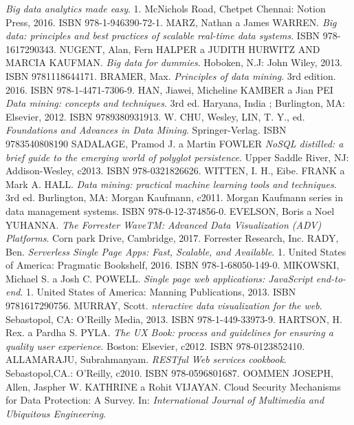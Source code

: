 \begin{thebibliography}{99}
\textit{Big data analytics made easy}.
1. McNichols Road, Chetpet Chennai: Notion Press, 2016. ISBN 978-1-946390-72-1.
MARZ, Nathan a James WARREN.
\textit{Big data: principles and best practices of scalable real-time data systems}.
ISBN 978-1617290343.
NUGENT, Alan, Fern HALPER a JUDITH HURWITZ AND MARCIA KAUFMAN.
\textit{Big data for dummies}.
Hoboken, N.J: John Wiley, 2013. ISBN 9781118644171.
BRAMER, Max.
\textit{Principles of data mining}.
3rd edition. 2016. ISBN 978-1-4471-7306-9.
HAN, Jiawei, Micheline KAMBER a Jian PEI
\textit{Data mining: concepts and techniques}.
3rd ed. Haryana, India ; Burlington, MA: Elsevier, 2012. ISBN 9789380931913.
W. CHU, Wesley, LIN, T. Y., ed.
\textit{Foundations and Advances in Data Mining}.
Springer-Verlag. ISBN 9783540808190
SADALAGE, Pramod J. a Martin FOWLER
\textit{NoSQL distilled: a brief guide to the emerging world of polyglot persistence}.
Upper Saddle River, NJ: Addison-Wesley, c2013. ISBN 978-0321826626.
WITTEN, I. H., Eibe. FRANK a Mark A. HALL.
\textit{Data mining: practical machine learning tools and techniques}.
3rd ed. Burlington, MA: Morgan Kaufmann, c2011. Morgan Kaufmann series in data management systems. ISBN 978-0-12-374856-0.
EVELSON, Boris a Noel YUHANNA.
\textit{The Forrester WaveTM: Advanced Data Visualization (ADV) Platforms}.
Corn park Drive, Cambridge, 2017. Forrester Research, Inc.
RADY, Ben.
\textit{Serverless Single Page Apps: Fast, Scalable, and Available}.
1. United States of America: Pragmatic Bookshelf, 2016. ISBN 978-1-68050-149-0.
MIKOWSKI, Michael S. a Josh C. POWELL.
\textit{Single page web applications: JavaScript end-to-end}.
1. United States of America: Manning Publications, 2013. ISBN 9781617290756.
MURRAY, Scott.
\textit{nteractive data visualization for the web}.
Sebastopol, CA: O'Reilly Media, 2013. ISBN 978-1-449-33973-9.
HARTSON, H. Rex. a Pardha S. PYLA.
\textit{The UX Book: process and guidelines for ensuring a quality user experience}.
Boston: Elsevier, c2012. ISBN 978-0123852410.
ALLAMARAJU, Subrahmanyam.
\textit{RESTful Web services cookbook}.
Sebastopol,CA.: O'Reilly, c2010. ISBN 978-0596801687.
OOMMEN JOSEPH, Allen, Jaspher W. KATHRINE a Rohit VIJAYAN.
Cloud Security Mechanisms for Data Protection: A Survey. In: \textit{International Journal of Multimedia and Ubiquitous Engineering}.

\end{thebibliography}
